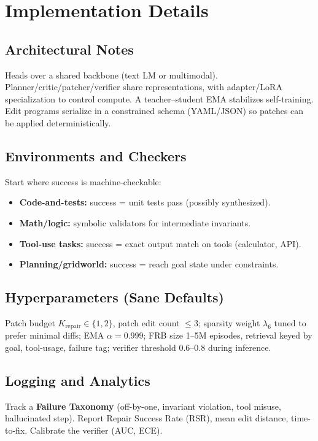 \documentclass[11pt]{article}
\begin{document}
\section{Implementation Details}
\subsection{Architectural Notes}
Heads over a shared backbone (text LM or multimodal). Planner/critic/patcher/verifier share representations, with adapter/LoRA specialization to control compute. A teacher--student EMA stabilizes self-training. Edit programs serialize in a constrained schema (YAML/JSON) so patches can be applied deterministically.

\subsection{Environments and Checkers}
Start where success is machine-checkable:
\begin{itemize}[leftmargin=1.2em]
    \item \textbf{Code-and-tests:} success = unit tests pass (possibly synthesized).
    \item \textbf{Math/logic:} symbolic validators for intermediate invariants.
    \item \textbf{Tool-use tasks:} success = exact output match on tools (calculator, API).
    \item \textbf{Planning/gridworld:} success = reach goal state under constraints.
\end{itemize}

\subsection{Hyperparameters (Sane Defaults)}
Patch budget $K_{\text{repair}}\in\{1,2\}$, patch edit count $\leq 3$; sparsity weight $\lambda_6$ tuned to prefer minimal diffs; EMA $\alpha = 0.999$; FRB size 1--5M episodes, retrieval keyed by goal, tool-usage, failure tag; verifier threshold 0.6--0.8 during inference.

\subsection{Logging and Analytics}
Track a \textbf{Failure Taxonomy} (off-by-one, invariant violation, tool misuse, hallucinated step). Report Repair Success Rate (RSR), mean edit distance, time-to-fix. Calibrate the verifier (AUC, ECE).
\end{document}
